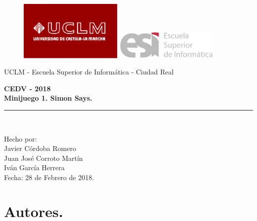 \documentclass{article}
\begin{document}
\begin{titlepage}
\begin{center}
\vspace*{-1in}
\begin{figure}[htb]
\begin{center}
\includegraphics[width=5cm]{./images/uclm_logo.eps} 
\hspace*{1.5in}
\includegraphics[width=5cm]{./images/esi_logo.eps}
\end{center}
\end{figure}
\end{center}
\begin{center}
UCLM - Escuela Superior de Informática - Ciudad Real\\
\vspace*{0.6in}
\vspace*{0.2in}
\begin{Large}
\textbf{CEDV - 2018} \\
\textbf{Minijuego 1. Simon Says.} \\
\end{Large}
\vspace*{0.3in}
\vspace*{0.3in}
\rule{80mm}{0.1mm}\\
\vspace*{0.1in}
\begin{large}
Hecho por: \\
Javier Córdoba Romero \\
Juan José Corroto Martín \\
Iván García Herrera \\
\vspace*{0.3in}
Fecha: 28 de Febrero de 2018.\\
\end{large}
\end{center}

\end{titlepage}
\tableofcontents
\newpage

\section{Autores.}
\end{document}
